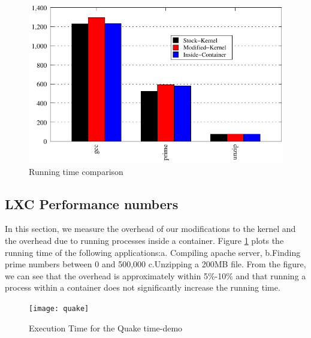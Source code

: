 \begin{figure}[tbh]
\centering
\includegraphics[width=1.0\columnwidth]{perf}
\caption{Running time comparison}
\label{fig:perf}
\end{figure}

\subsection{LXC Performance numbers}
In this section, we measure the overhead of our modifications to the kernel and the overhead due to running processes inside a container. Figure \ref{fig:perf} plots the running time of the following applications:a. Compiling apache server, b.Finding prime numbers between 0 and 500,000 c.Unzipping a 200MB file.
From the figure, we can see that the overhead is approximately within 5\%-10\% and that running a process within a container does not significantly increase the running time.


\begin{figure}[tbh]
\centering
\texttt{[image: quake]}
\caption{Execution Time for the Quake time-demo}
\label{fig:Quake}
\end{figure}

